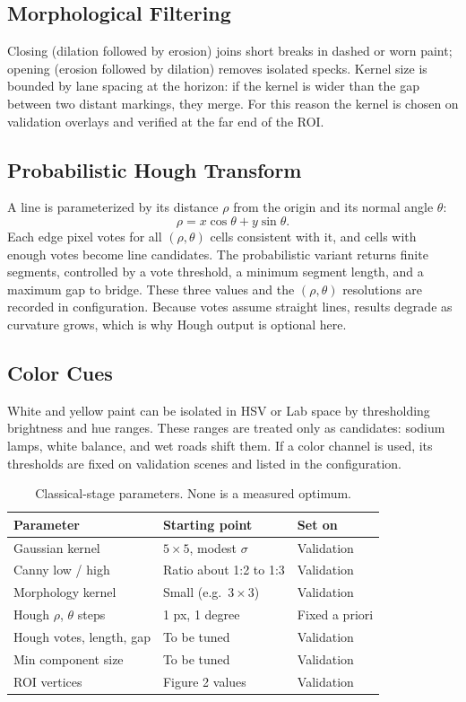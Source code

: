 \documentclass[10pt,a4paper,twocolumn]{article}
\begin{document}
\subsection{Morphological Filtering}
Closing (dilation followed by erosion) joins short breaks in dashed or worn paint; opening (erosion followed by dilation) removes isolated specks. Kernel size is bounded by lane spacing at the horizon: if the kernel is wider than the gap between two distant markings, they merge. For this reason the kernel is chosen on validation overlays and verified at the far end of the ROI.

\subsection{Probabilistic Hough Transform}
A line is parameterized by its distance $\rho$ from the origin and its normal angle $\theta$:
\begin{equation}
\rho = x\cos\theta + y\sin\theta.
\end{equation}
Each edge pixel votes for all $(\rho,\theta)$ cells consistent with it, and cells with enough votes become line candidates. The probabilistic variant returns finite segments, controlled by a vote threshold, a minimum segment length, and a maximum gap to bridge. These three values and the $(\rho,\theta)$ resolutions are recorded in configuration. Because votes assume straight lines, results degrade as curvature grows, which is why Hough output is optional here.

\subsection{Color Cues}
White and yellow paint can be isolated in HSV or Lab space by thresholding brightness and hue ranges. These ranges are treated only as candidates: sodium lamps, white balance, and wet roads shift them. If a color channel is used, its thresholds are fixed on validation scenes and listed in the configuration.

\begin{table}[H]
\centering
\caption{Classical-stage parameters. None is a measured optimum.}
\footnotesize
\begin{tabularx}{\columnwidth}{|l|l|l|}
\hline
\rowcolor{gray!18}\textbf{Parameter}&\textbf{Starting point}&\textbf{Set on}\\ \hline
Gaussian kernel & $5\times5$, modest $\sigma$ & Validation\\ \hline
Canny low / high & Ratio about 1:2 to 1:3 & Validation\\ \hline
Morphology kernel & Small (e.g.\ $3\times3$) & Validation\\ \hline
Hough $\rho$, $\theta$ steps & 1 px, 1 degree & Fixed a priori\\ \hline
Hough votes, length, gap & To be tuned & Validation\\ \hline
Min component size & To be tuned & Validation\\ \hline
ROI vertices & Figure 2 values & Validation\\ \hline
\end{tabularx}
\end{table}
\end{document}
